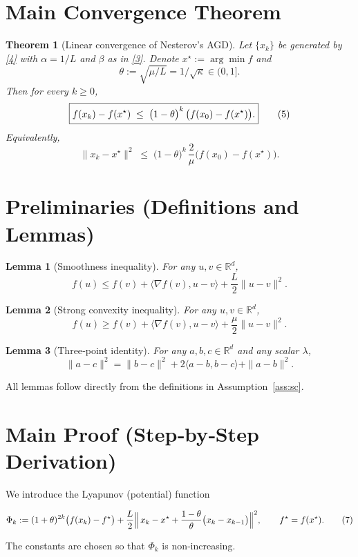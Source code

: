 \documentclass{article}
\newtheorem{theorem}{Theorem}
\newtheorem{lemma}{Lemma}
\begin{document}
\section*{Main Convergence Theorem}
\begin{theorem}[Linear convergence of Nesterov’s AGD]\label{thm:linear}
Let $\{x_{k}\}$ be generated by \eqref{4} with $\alpha=1/L$ and
$\beta$ as in \eqref{3}.  Denote $x^{\star}:=\arg\min f$ and
\[
\theta:=\sqrt{\mu/L}=1/\sqrt{\kappa}\in(0,1].
\]
Then for every $k\ge 0$,
\[
\boxed{%
f(x_{k})-f(x^{\star})\;\le\;
\bigl(1-\theta\bigr)^{k}\,
\bigl(f(x_{0})-f(x^{\star})\bigr).}
\tag{5}
\]
Equivalently,
\[
\|x_{k}-x^{\star}\|^{2}\;\le\;
\bigl(1-\theta\bigr)^{k}\,
\frac{2}{\mu}\bigl(f(x_{0})-f(x^{\star})\bigr).
\tag{6}
\]
\end{theorem}

\section*{Preliminaries (Definitions and Lemmas)}
\begin{lemma}[Smoothness inequality]\label{lem:smooth}
For any $u,v\in\mathbb{R}^{d}$,
\[
f(u)\le f(v)+\langle\nabla f(v),u-v\rangle+\frac{L}{2}\|u-v\|^{2}.
\]
\end{lemma}
\begin{lemma}[Strong convexity inequality]\label{lem:strong}
For any $u,v\in\mathbb{R}^{d}$,
\[
f(u)\ge f(v)+\langle\nabla f(v),u-v\rangle+\frac{\mu}{2}\|u-v\|^{2}.
\]
\end{lemma}
\begin{lemma}[Three‑point identity]\label{lem:three}
For any $a,b,c\in\mathbb{R}^{d}$ and any scalar $\lambda$,
\[
\|a-c\|^{2}= \|b-c\|^{2}+2\langle a-b, b-c\rangle+\|a-b\|^{2}.
\]
\end{lemma}
All lemmas follow directly from the definitions in Assumption~\ref{ass:sc}.

\section*{Main Proof (Step‑by‑Step Derivation)}
We introduce the Lyapunov (potential) function  

\[
\Phi_{k}:=
(1+\theta)^{2k}\bigl(f(x_{k})-f^{\star}\bigr)
+\frac{L}{2}\Bigl\|\,x_{k}-x^{\star}
      +\frac{1-\theta}{\theta}\bigl(x_{k}-x_{k-1}\bigr)\Bigr\|^{2},
\qquad
f^{\star}=f(x^{\star}).
\tag{7}
\]

The constants are chosen so that $\Phi_{k}$ is non‑increasing.
\end{document}
